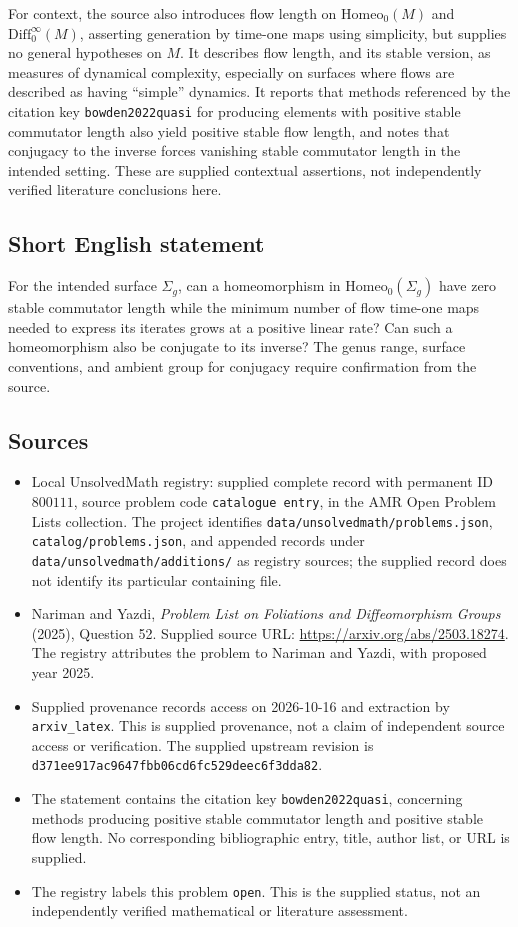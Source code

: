 \documentclass[11pt]{article}
\begin{document}
For context, the source also introduces flow length on \(\mathrm{Homeo}_0(M)\) and \(\mathrm{Diff}_0^\infty(M)\), asserting generation by time-one maps using simplicity, but supplies no general hypotheses on \(M\). It describes flow length, and its stable version, as measures of dynamical complexity, especially on surfaces where flows are described as having ``simple'' dynamics. It reports that methods referenced by the citation key \texttt{bowden2022quasi} for producing elements with positive stable commutator length also yield positive stable flow length, and notes that conjugacy to the inverse forces vanishing stable commutator length in the intended setting. These are supplied contextual assertions, not independently verified literature conclusions here.
\subsection{Short English statement}
For the intended surface \(\Sigma_g\), can a homeomorphism in \(\mathrm{Homeo}_0(\Sigma_g)\) have zero stable commutator length while the minimum number of flow time-one maps needed to express its iterates grows at a positive linear rate? Can such a homeomorphism also be conjugate to its inverse? The genus range, surface conventions, and ambient group for conjugacy require confirmation from the source.
\subsection{Sources}
\begin{itemize}
\item Local UnsolvedMath registry: supplied complete record with permanent ID \(800111\), source problem code \texttt{catalogue entry}, in the AMR Open Problem Lists collection. The project identifies \texttt{data/unsolvedmath/problems.json}, \texttt{catalog/problems.json}, and appended records under \texttt{data/unsolvedmath/additions/} as registry sources; the supplied record does not identify its particular containing file.
\item Nariman and Yazdi, \emph{Problem List on Foliations and Diffeomorphism Groups} (2025), Question 52. Supplied source URL: \url{https://arxiv.org/abs/2503.18274}. The registry attributes the problem to Nariman and Yazdi, with proposed year 2025.
\item Supplied provenance records access on 2026-10-16 and extraction by \texttt{arxiv\_latex}. This is supplied provenance, not a claim of independent source access or verification. The supplied upstream revision is \texttt{d371ee917ac9647fbb06cd6fc529deec6f3dda82}.
\item The statement contains the citation key \texttt{bowden2022quasi}, concerning methods producing positive stable commutator length and positive stable flow length. No corresponding bibliographic entry, title, author list, or URL is supplied.
\item The registry labels this problem \texttt{open}. This is the supplied status, not an independently verified mathematical or literature assessment.
\end{itemize}
\end{document}
